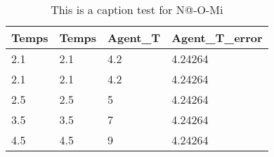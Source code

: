 \begin{table}[h]
	\caption{This is a caption test for N@-O-Mi}\label{tab:This is a label test for N@-O-Mi}
		\begin{tabular}{|l|l|l|l|}
		\hline
		Temps & Temps & Agent_T & Agent_T_error\\ \hline
		2.1 & 2.1 & 4.2 & 4.24264\\ \hline
		2.1 & 2.1 & 4.2 & 4.24264\\ \hline
		2.5 & 2.5 & 5 & 4.24264\\ \hline
		3.5 & 3.5 & 7 & 4.24264\\ \hline
		4.5 & 4.5 & 9 & 4.24264\\ \hline
		\hline
	\end{tabular}
\end{table}
